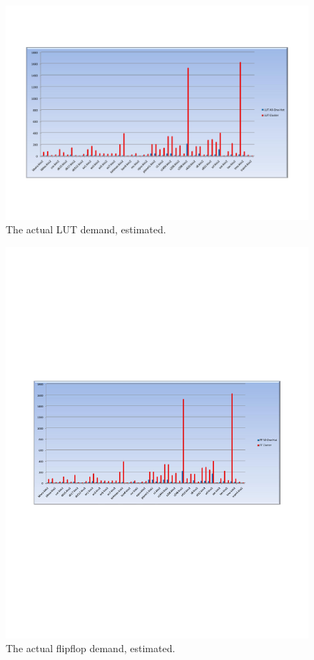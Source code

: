 \begin{figure}[ht]
\centering
\includegraphics[scale=0.7, trim=400 120 400 200]{images/output2_praktik.pdf}
\caption{The actual LUT demand, estimated.}
\label{fig:practical1}
\end{figure}
\begin{figure}[ht]
\centering
\includegraphics[scale=1.0, trim=400 280 400 270]{images/output2_praktik_FF.pdf}
\caption{The actual flipflop demand, estimated.}
\label{fig:practical2}
\end{figure}


